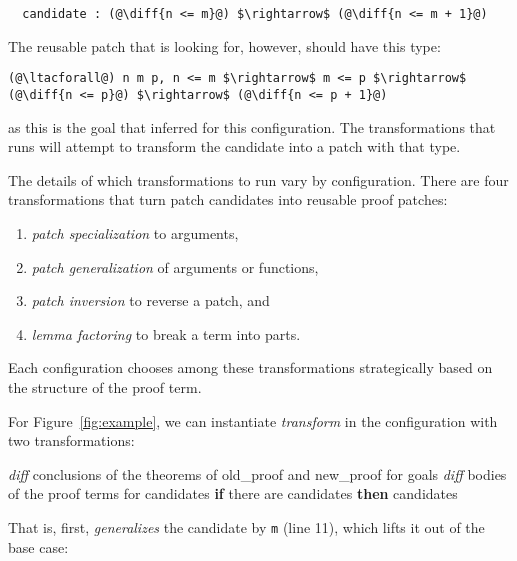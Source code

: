 \begin{lstlisting}
  candidate : (@\diff{n <= m}@) $\rightarrow$ (@\diff{n <= m + 1}@)
\end{lstlisting}
The reusable patch that \sysname is looking for, however, should have this type:

\begin{lstlisting}[language=coq]
  (@\ltacforall@) n m p, n <= m $\rightarrow$ m <= p $\rightarrow$ (@\diff{n <= p}@) $\rightarrow$ (@\diff{n <= p + 1}@)
\end{lstlisting}
as this is the goal that \sysname inferred for this configuration.
The transformations that \sysname runs will attempt to transform the candidate
into a patch with that type.

The details of which transformations to run vary by configuration.
There are four transformations that turn patch candidates into reusable proof patches:

\begin{enumerate}
\item \textit{patch specialization} to arguments,
\item \textit{patch generalization} of arguments or functions,
\item \textit{patch inversion} to reverse a patch, and
\item \textit{lemma factoring} to break a term into parts.
\end{enumerate}
Each configuration chooses among these transformations strategically based on the structure of the proof term.

For Figure~\ref{fig:example}, we can instantiate \textit{transform} in the configuration with two transformations:

\begin{algorithm}
\footnotesize
\begin{algorithmic}[1]
    \STATE \textit{diff} conclusions of the theorems of old\_proof and new\_proof for goals
    \STATE \textit{diff} bodies of the proof terms for candidates
    \STATE \textbf{if} there are candidates \textbf{then}
    \STATE \hspace*{1em}  candidates
\end{algorithmic}
\end{algorithm}
That is, first, \sysname \textit{generalizes} the candidate by \lstinline{m} (line 11), which lifts it out of the base case:

